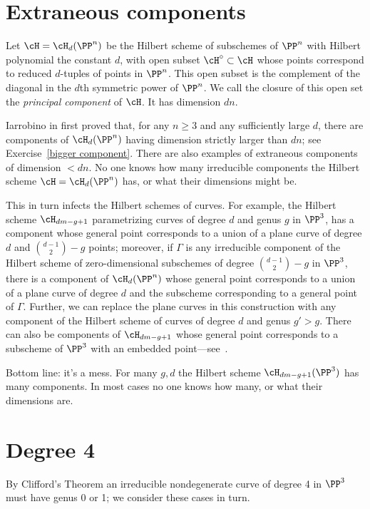 \section{Extraneous components}

 Let $\cH = \cH_d(\PP^n)$ be the Hilbert scheme of subschemes of $\PP^n$ with Hilbert polynomial the constant $d$, with open subset $\cH^\circ \subset \cH$ whose points correspond to reduced $d$-tuples of points in $\PP^n$. This open subset is the complement of the diagonal in the $d$th symmetric power of $\PP^n$. We call the closure of this open set the \emph{principal component} of $\cH$. It has dimension $dn$.

Iarrobino in \cite{Iarrobino1985} first proved that, for any $n \geq 3$ and any sufficiently large $d$, there are components of $\cH_d(\PP^n)$ having dimension strictly larger than $dn$; see Exercise~\ref{bigger component}. There are also examples of extraneous components
of dimension $<dn$. No one knows how many irreducible components the Hilbert scheme $\cH = \cH_d(\PP^n)$ has, or what their dimensions might be.

This in turn infects the Hilbert schemes of curves. For example, the Hilbert scheme $\cH_{dm-g+1}$ parametrizing curves of degree $d$ and genus $g$ in $\PP^3$, has a component whose general point corresponds to a union of a plane curve of degree $d$ and $\binom{d-1}{2} - g$ points; moreover, if $\Gamma$ is any irreducible component of the Hilbert scheme of zero-dimensional subschemes of degree $\binom{d-1}{2} - g$ in $\PP^3$, there is a component of $\cH_d(\PP^n)$ whose  general point corresponds to a union of a plane curve of degree $d$ and the subscheme corresponding to a general point of $\Gamma$. Further, we can replace the plane curves in this construction with any component of the Hilbert scheme of curves of degree $d$ and genus $g' > g$. There can also be components of $\cH_{dm-g+1}$ whose general point corresponds to a subscheme of $\PP^3$ with an embedded point---see~\cite{Chen-Nollet}.

Bottom line: it's a mess. For many $g,d$ the Hilbert scheme $\cH_{dm-g+1}(\PP^3)$ has many components. In most cases no one knows how many, or what their dimensions are. 

\section{Degree 4}

By Clifford's Theorem  an irreducible nondegenerate curve of degree 4 in $\PP^{3}$ must have genus 0 or 1; we consider these cases in turn.

